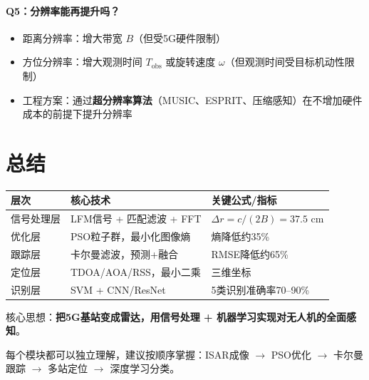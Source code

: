 \documentclass[12pt, a4paper]{article}
\begin{document}
\paragraph{Q5：分辨率能再提升吗？}
\begin{itemize}
  \item 距离分辨率：增大带宽 $B$（但受5G硬件限制）
  \item 方位分辨率：增大观测时间 $T_\text{obs}$ 或旋转速度 $\omega$（但观测时间受目标机动性限制）
  \item 工程方案：通过\textbf{超分辨率算法}（MUSIC、ESPRIT、压缩感知）在不增加硬件成本的前提下提升分辨率
\end{itemize}

\section*{总结}

\begin{keybox}[技术栈一览]
\begin{center}
\begin{tabular}{lll}
\toprule
层次 & 核心技术 & 关键公式/指标 \\
\midrule
信号处理层 & LFM信号 + 匹配滤波 + FFT & $\Delta r = c/(2B) = 37.5\text{ cm}$ \\
优化层 & PSO粒子群，最小化图像熵 & 熵降低约35\% \\
跟踪层 & 卡尔曼滤波，预测+融合 & RMSE降低约65\% \\
定位层 & TDOA/AOA/RSS，最小二乘 & 三维坐标 \\
识别层 & SVM + CNN/ResNet & 5类识别准确率70--90\% \\
\bottomrule
\end{tabular}
\end{center}
\end{keybox}

\vspace{1em}
\noindent
核心思想：\textbf{把5G基站变成雷达，用信号处理 + 机器学习实现对无人机的全面感知}。

每个模块都可以独立理解，建议按顺序掌握：ISAR成像 $\to$ PSO优化 $\to$ 卡尔曼跟踪 $\to$ 多站定位 $\to$ 深度学习分类。
\end{document}
